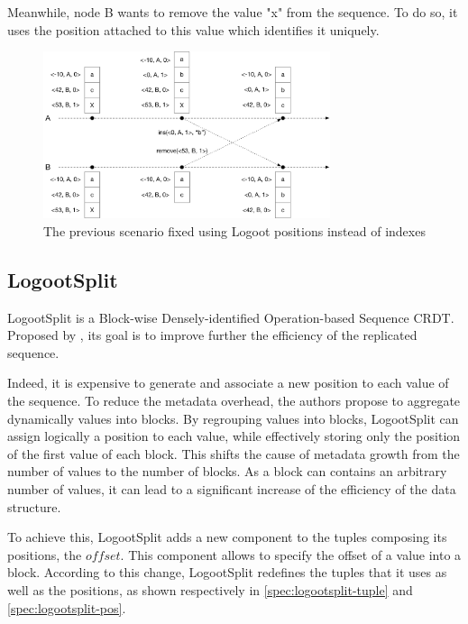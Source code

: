 \documentclass{article}
\theoremstyle{definition}
\newcounter{note-counter}
\theoremstyle{definition}
\theoremstyle{definition}
\theoremstyle{definition}
\begin{document}
Meanwhile, node B wants to remove the value "x" from the sequence.
To do so, it uses the position attached to this value which identifies it uniquely.


\begin{figure}
    \centering
        \includegraphics[width=0.75\textwidth]{img/pos-based-seq.pdf}
    \caption{The previous scenario fixed using Logoot positions instead of indexes}
    \label{fig:logoot-seq-convergence}
\end{figure}


\subsection{LogootSplit \cite{AndreCollaborateCom2013}}

LogootSplit is a Block-wise Densely-identified Operation-based Sequence \ac{CRDT}.
Proposed by \textcite{AndreCollaborateCom2013}, its goal is to improve further the efficiency of the replicated sequence.

Indeed, it is expensive to generate and associate a new position to each value of the sequence.
To reduce the metadata overhead, the authors propose to aggregate dynamically values into blocks.
By regrouping values into blocks, LogootSplit can assign logically a position to each value, while effectively storing only the position of the first value of each block.
This shifts the cause of metadata growth from the number of values to the number of blocks.
As a block can contains an arbitrary number of values, it can lead to a significant increase of the efficiency of the data structure.

To achieve this, LogootSplit adds a new component to the tuples composing its positions, the $offset$.
This component allows to specify the offset of a value into a block.
According to this change, LogootSplit redefines the tuples that it uses as well as the positions, as shown respectively in \autoref{spec:logootsplit-tuple} and \autoref{spec:logootsplit-pos}.
\end{document}
